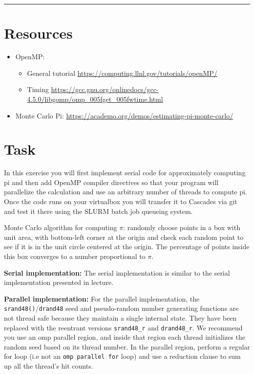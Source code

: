 \documentclass[letter]{article}
\begin{document}
\hrule

\pagebreak

\section*{Resources}

\begin{itemize}

    \item OpenMP:
        \begin{itemize}
            \item General tutorial  \url{https://computing.llnl.gov/tutorials/openMP/}
            \item Timing  \url{https://gcc.gnu.org/onlinedocs/gcc-4.5.0/libgomp/omp_005fget_005fwtime.html}
        \end{itemize}
    \item Monte Carlo Pi: \url{https://academo.org/demos/estimating-pi-monte-carlo/}

\end{itemize}

\section*{Task}
In this exercise you will first implement serial code for approximately computing pi and then add OpenMP compiler directives so that your program will parallelize the calculation and use an arbitrary number of threads to compute pi. Once the code runs on your virtualbox you will transfer it to Cascades via git and test it there using the SLURM batch job queueing system.

Monte Carlo algorithm for computing $\pi$: randomly choose points in a box with unit area, with bottom-left corner at the origin and check each random point to see if it is in the unit circle centered at the origin.  The percentage of points inside this box converges to a number proportional to $\pi$.

\textbf{Serial implementation:} The serial implementation is similar to the serial implementation presented in lecture. 

\textbf{Parallel implementation:}  For the parallel implementation, the \texttt{srand48()}/\texttt{drand48} seed and pseudo-random number generating functions are not thread safe because they maintain a single internal state. They have been replaced with the reentrant versions \texttt{srand48\_r} and \texttt{drand48\_r}.  We recommend you use an omp parallel region, and inside that region each thread initializes the random seed based on its thread number.  In the parallel region, perform a regular for loop (i.e not an \texttt{omp parallel for} loop) and use a reduction clause to sum up all the thread’s hit counts.
\end{document}
